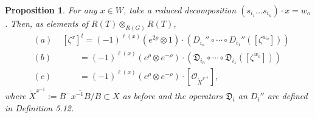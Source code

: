 \documentclass{article}
\newtheorem{proposition}[theorem]{Proposition}
\def\ref#1{#1}
\def\D{\mathfrak{D}}
\begin{document}
\begin{proposition}\label{5.14}
For any $x\in W$, take a reduced decomposition $\left( s_{i_1}\ldots s_{i_n}\right)\cdot x=w_o$. Then, as elements of $R(T) \otimes _{R(G)} R(T)$, 
\begin{eqnarray*}
&(a)& \,\,\left[\zeta^x\right]^t = (-1)^{\ell(x)}\left( e^{2\rho}\otimes 1\right) \cdot \left( D_{i_n}''\circ \cdots \circ D_{i_1}'' \left( \left[ \zeta^{w_o}\right]\right)\right)\\
&(b)&\,\,\qquad  = (-1)^{\ell(x)}\left( e^{\rho}\otimes e^{-\rho}\right) \cdot \left( \D_{i_n}\circ \cdots \circ \D_{i_1} \left( \left[ \zeta^{w_o}\right]\right)\right)\\
&(c)&\,\, \qquad= (-1)^{\ell(x)}\left( e^{\rho}\otimes e^{-\rho}\right) \cdot \left[ \mathcal{O}_{\mathring{X}^{x^{-1}}}\right],
\end{eqnarray*}
where $\mathring{X}^{x^{-1}} := \overline{B^- x^{-1} B/B} \subset X$ as before and the operators
$\D_i$ an $D_i''$ are defined in Definition \ref{5.12}. 
\end{proposition}
\end{document}
